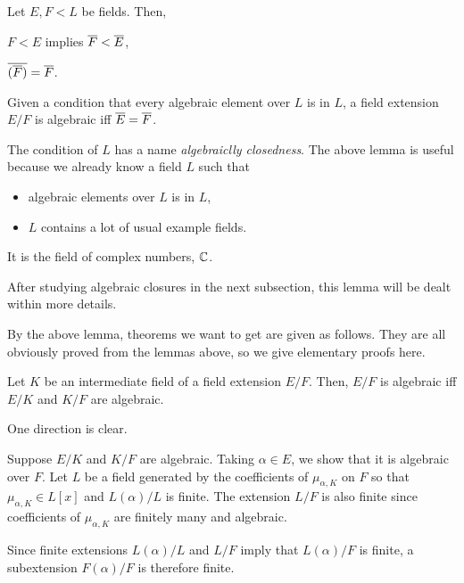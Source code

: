 \documentclass{../exp}
\begin{document}
\begin{lem}
Let $E,F<L$ be fields.
Then,
\begin{cond}
\item $F<E$ implies $\overline F<\overline E$,
\item $\overline{(\overline F)}=\overline F$.
\end{cond}
\begin{pf}
\end{pf}
\end{lem}
\begin{lem}
Given a condition that every algebraic element over $L$ is in $L$, a field extension $E/F$ is algebraic iff $\overline E=\overline F$.
\end{lem}
\begin{pf}
\end{pf}
\begin{rmk}
The condition of $L$ has a name \emph{algebraiclly closedness}.
The above lemma is useful because we already know a field $L$ such that
\begin{itemize}
\item algebraic elements over $L$ is in $L$,
\item $L$ contains a lot of usual example fields.
\end{itemize}
It is the field of complex numbers, $\mathbb{C}$.

After studying algebraic closures in the next subsection, this lemma will be dealt within more details.
\end{rmk}

By the above lemma, theorems we want to get are given as follows.
They are all obviously proved from the lemmas above, so we give elementary proofs here.

\begin{thm}
Let $K$ be an intermediate field of a field extension $E/F$.
Then, $E/F$ is algebraic iff $E/K$ and $K/F$ are algebraic.
\end{thm}
\begin{pf}
One direction is clear.

Suppose $E/K$ and $K/F$ are algebraic.
Taking $\alpha\in E$, we show that it is algebraic over $F$.
Let $L$ be a field generated by the coefficients of $\mu_{\alpha,K}$ on $F$ so that $\mu_{\alpha,K}\in L[x]$ and $L(\alpha)/L$ is finite.
The extension $L/F$ is also finite since coefficients of $\mu_{\alpha,K}$ are finitely many and algebraic.

Since finite extensions $L(\alpha)/L$ and $L/F$ imply that $L(\alpha)/F$ is finite, a subextension $F(\alpha)/F$ is therefore finite.
\end{pf}
\end{document}
